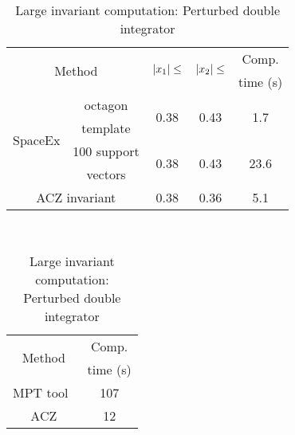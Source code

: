 \begin{table}
\begin{minipage}{0.45\textwidth}
\begin{tabular}{|l|c|c|c|c|}
\hline
\multicolumn{2}{|c|}{\multirow{2}{*}{Method}} &
\multirow{2}{*}{$\left|x_1\right|\leq$} & \multirow{2}{*}{$\left|x_2\right|\leq$} & Comp.\\
\multicolumn{2}{|c|}{} & & & time (s) \\
\hline
\multirow{4}{*}{SpaceEx} & octagon & \multirow{2}{*}{0.38} &
\multirow{2}{*}{0.43} & \multirow{2}{*}{1.7}\\
& template & & &\\
\cline{2-5}
& 100 support & \multirow{2}{*}{0.38} & \multirow{2}{*}{0.43} & \multirow{2}{*}{23.6}\\
& vectors & & &\\
\hline
\multicolumn{2}{|c|}{\multirow{2}{*}{ACZ invariant}} &
\multirow{2}{*}{0.38} & \multirow{2}{*}{0.36} & 
\multirow{2}{*}{5.1}\\
\multicolumn{2}{|c|}{} & & &\\
\hline
\end{tabular}
\caption{Small invariant computation:\newline Perturbed double
  integrator}
~\label{tab:smallinv-pdi}
\end{minipage}
\hspace{4em}
\begin{minipage}{0.4\textwidth}
\begin{tabular}{|c|c|}
\hline
\multirow{2}{*}{Method} & Comp.\\
& time (s)\\
\hline
\multirow{2}{*}{MPT tool~\cite{rakovic2004computation}} & \multirow{2}{*}{107}\\
& \\
\hline
\multirow{2}{*}{ACZ} & \multirow{2}{*}{12}\\
& \\
\hline
\end{tabular}
\caption{Large invariant computation: Perturbed double integrator}
~\label{tab:largeinv-pdi}
\end{minipage}
\end{table}
